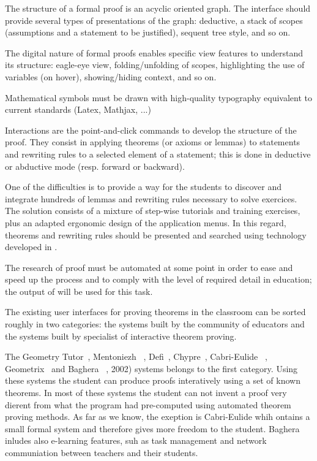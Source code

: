 The structure of a formal proof is an acyclic oriented graph.
The interface should provide several types of presentations of the graph:
deductive, a stack of scopes (assumptions and a statement to be justified),
sequent tree style, and so on.

The digital nature of formal proofs enables specific view features
to understand its structure: eagle-eye view, folding/unfolding of
scopes, highlighting the use of variables (on hover), showing/hiding
context, and so on.

Mathematical symbols must be drawn with high-quality typography equivalent
to current standards (Latex, Mathjax, ...)

Interactions are the point-and-click commands to develop the structure
of the proof. They consist in applying theorems (or axioms or lemmas)
to statements and rewriting rules to a selected element of a
statement; this is done in deductive or abductive mode (resp. forward
or backward).

One of the difficulties is to provide a way for the students to discover
and integrate hundreds of lemmas and rewriting rules necessary to solve
exercices. The solution consists of a mixture of step-wise tutorials and
training exercises, plus an adapted ergonomic design of the application menus.
In this regard, theorems and rewriting rules should be presented and searched using
technology developed in .

The research of proof must be automated at some point in order to ease and
speed up the process and to comply with the level of required detail in education;
the output of  will be used for this task.


The existing user interfaces for proving theorems in the classroom can be sorted roughly in two categories: 
the systems built by the community of educators and the systems built by specialist of interactive theorem proving.

The Geometry Tutor~\cite{anderson_geometry_1985}, Mentoniezh ~\cite{py_reconnaissance_1990},
Defi~\cite{ag-almouloud_ordinateur_1992}, Chypre~\cite{bernat_chypre:_1993}, Cabri-Eulide ~\cite{luengo_cabri-euclide:_1997}, Geometrix~\cite{gressier_geometrix_1988}  and Baghera ~\cite{balacheff_baghera_1999},
2002) systems belongs to the first category. Using these systems the
student can produce proofs interatively using a set of known theorems.
In most of these systems the student can not invent a proof very dierent
from what the program had pre-computed using automated theorem
proving methods. As far as we know, the exeption is Cabri-Eulide
whih ontains a small formal system and therefore gives more freedom
to the student. Baghera inludes also e-learning features, suh as task
management and network communiation between teachers and their
students.

